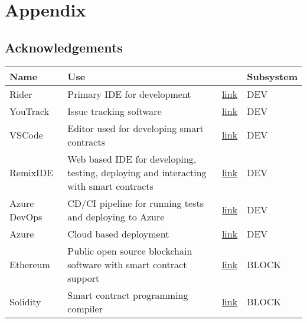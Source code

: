 \section{Appendix}

\subsection{Acknowledgements}

\begin{table}[H]
\begin{tabular}{|p{}|p{}|p{}|p{}|}
\hline
Name           & Use                                                                                   &                                               & Subsystem \\ \hline
Rider          & Primary IDE for development                                                           & \href{https://www.jetbrains.com/rider}{link}                  & DEV       \\ \hline
YouTrack       & Issue tracking software                                                               & \href{https://www.jetbrains.com/youtrack}{link}               & DEV       \\ \hline
VSCode         & Editor used for developing smart contracts                                            & \href{https://code.visualstudio.com}{link}                     & DEV       \\ \hline
RemixIDE       & Web based IDE for developing, testing, deploying and interacting with smart contracts & \href{https://remix.ethereum.org/}{link}                       & DEV       \\ \hline
Azure DevOps   & CD/CI pipeline for running tests and deploying to Azure                               & \href{https://azure.microsoft.com/en-us/services/devops}{link} & DEV       \\ \hline
Azure          & Cloud based deployment                                                                & \href{https://azure.microsoft.com/}{link}                      & DEV       \\ \hline
Ethereum       & Public open source blockchain software with smart contract support                    & \href{https://ethereum.org}{link}                              & BLOCK     \\ \hline
Solidity       & Smart contract programming compiler                                                   & \href{https://docs.soliditylang.org}{link}                     & BLOCK     \\ \hline

\end{tabular}
\end{table}
